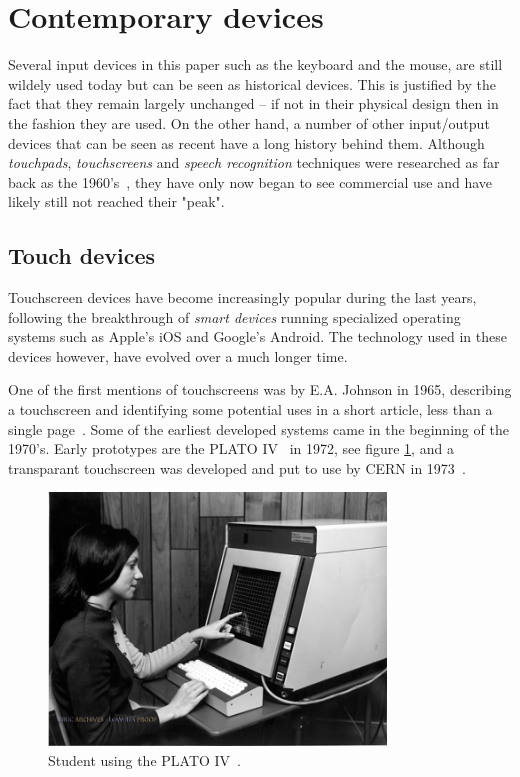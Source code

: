 \section{Contemporary devices}
\label{current}
Several input devices in this paper such as the keyboard and the mouse, are still wildely used today but can be seen as historical devices. This is justified by the fact that they remain largely unchanged -- if not in their physical design then in the fashion they are used. On the other hand, a number of other input/output devices that can be seen as recent have a long history behind them. Although \emph{touchpads}, \emph{touchscreens} and \emph{speech recognition} techniques were researched as far back as the 1960's~\cite{buxton,shoebox}, they have only now began to see commercial use and have likely still not reached their "peak". 


\subsection{Touch devices}
Touchscreen devices have become increasingly popular during the last years, following the breakthrough of \emph{smart devices} running specialized operating systems such as Apple's iOS and Google's Android. The technology used in these devices however, have evolved over a much longer time.

One of the first mentions of touchscreens was by E.A. Johnson in 1965, describing a touchscreen and identifying some potential uses in a short article, less than a single page~\cite{4205802}. Some of the earliest developed systems came in the beginning of the 1970's. Early prototypes are the PLATO IV~\cite{buxton} in 1972, see figure \ref{platoIV}, and a transparant touchscreen was developed and put to use by CERN in 1973~\cite{cern}.

\begin{figure}[]
\includegraphics[width=0.8\textwidth] {bilder/platoiv.jpg}
\caption{Student using the PLATO IV~\cite{platoiv}.}
\label{platoIV}
\end{figure}

